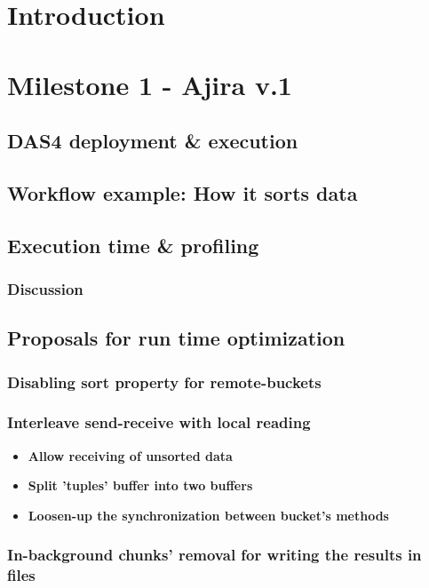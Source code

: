 \section*{Introduction}

\section{Milestone 1 - Ajira v.1}
% 
\subsection{DAS4 deployment \& execution}
% 
\subsection{Workflow example: How it sorts data}
% 
\subsection{Execution time \& profiling}
% 
\subsubsection*{Discussion}
% 
\subsection{Proposals for run time optimization}
% 
\subsubsection*{Disabling sort property for remote-buckets}
% 
\subsubsection*{Interleave send-receive with local reading}

\begin{itemize}
	\item \bf{Allow receiving of unsorted data}

	\item \bf{Split 'tuples' buffer into two buffers}

	\item \bf{Loosen-up the synchronization between bucket's methods}
\end{itemize}

% 
\subsubsection*{In-background chunks' removal for writing the results in files}
% 
